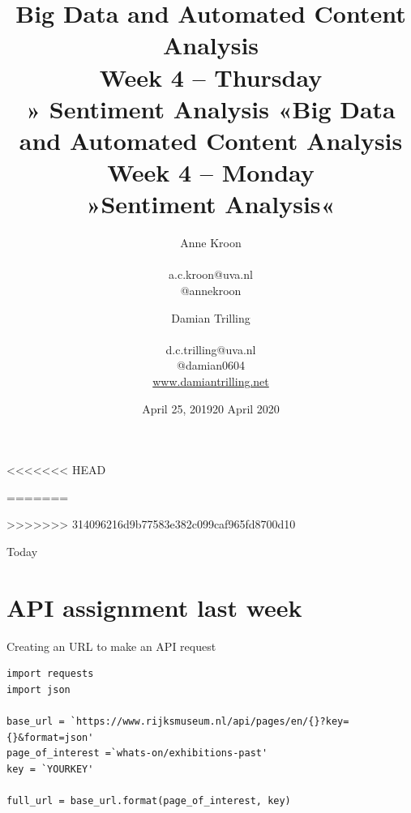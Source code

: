 \documentclass{beamer}
\begin{document}
<<<<<<< HEAD
\title[Big Data and Automated Content Analysis]{\textbf{Big Data and Automated Content Analysis} \\ Week 4 -- Thursday \\ » Sentiment Analysis «}
\author[Anne Kroon]{Anne Kroon \\ ~ \\ \footnotesize{a.c.kroon@uva.nl \\@annekroon} \\}
\date{April 25, 2019}
=======
\title[Big Data and Automated Content Analysis]{\textbf{Big Data and Automated Content Analysis} \\ Week 4 -- Monday \\ »Sentiment Analysis«}
\author[Damian Trilling]{Damian Trilling \\ ~ \\ \footnotesize{d.c.trilling@uva.nl \\@damian0604} \\ \url{www.damiantrilling.net}}
\date{20 April 2020}
>>>>>>> 314096216d9b77583e382c099caf965fd8700d10


\begin{frame}{}
\titlepage
\end{frame}

\begin{frame}{Today}
\tableofcontents
\end{frame}

\section{API assignment last week}

\begin{frame}[fragile]{Creating an URL to make an API request}
\begin{lstlisting}
import requests
import json

base_url = `https://www.rijksmuseum.nl/api/pages/en/{}?key={}&format=json'
page_of_interest =`whats-on/exhibitions-past'
key = `YOURKEY'

full_url = base_url.format(page_of_interest, key)

\end{lstlisting}
\end{frame}
\end{document}
